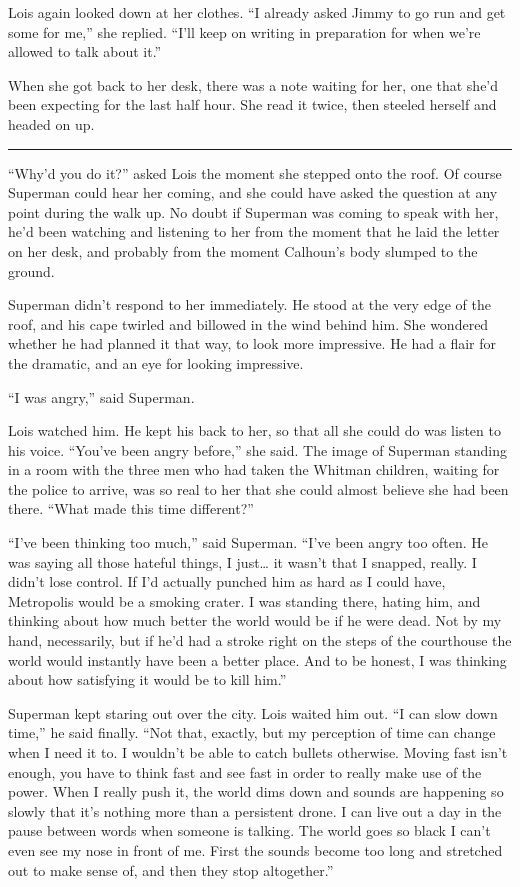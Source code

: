 \documentclass[ebook,12pt]{memoir}
\begin{document}
Lois again looked down at her clothes. ``I already asked Jimmy to go run
and get some for me,'' she replied. ``I'll keep on writing in
preparation for when we're allowed to talk about it.''

When she got back to her desk, there was a note waiting for her, one
that she'd been expecting for the last half hour. She read it twice,
then steeled herself and headed on up.

\begin{center}\rule{0.5\linewidth}{0.5pt}\end{center}

``Why'd you do it?'' asked Lois the moment she stepped onto the roof. Of
course Superman could hear her coming, and she could have asked the
question at any point during the walk up. No doubt if Superman was
coming to speak with her, he'd been watching and listening to her from
the moment that he laid the letter on her desk, and probably from the
moment Calhoun's body slumped to the ground.

Superman didn't respond to her immediately. He stood at the very edge of
the roof, and his cape twirled and billowed in the wind behind him. She
wondered whether he had planned it that way, to look more impressive. He
had a flair for the dramatic, and an eye for looking impressive.

``I was angry,'' said Superman.

Lois watched him. He kept his back to her, so that all she could do was
listen to his voice. ``You've been angry before,'' she said. The image
of Superman standing in a room with the three men who had taken the
Whitman children, waiting for the police to arrive, was so real to her
that she could almost believe she had been there. ``What made this time
different?''

``I've been thinking too much,'' said Superman. ``I've been angry too
often. He was saying all those hateful things, I just\ldots{} it wasn't
that I snapped, really. I didn't lose control. If I'd actually punched
him as hard as I could have, Metropolis would be a smoking crater. I was
standing there, hating him, and thinking about how much better the world
would be if he were dead. Not by my hand, necessarily, but if he'd had a
stroke right on the steps of the courthouse the world would instantly
have been a better place. And to be honest, I was thinking about how
satisfying it would be to kill him.''

Superman kept staring out over the city. Lois waited him out. ``I can
slow down time,'' he said finally. ``Not that, exactly, but my
perception of time can change when I need it to. I wouldn't be able to
catch bullets otherwise. Moving fast isn't enough, you have to think
fast and see fast in order to really make use of the power. When I
really push it, the world dims down and sounds are happening so slowly
that it's nothing more than a persistent drone. I can live out a day in
the pause between words when someone is talking. The world goes so black
I can't even see my nose in front of me. First the sounds become too
long and stretched out to make sense of, and then they stop
altogether.''
\end{document}
